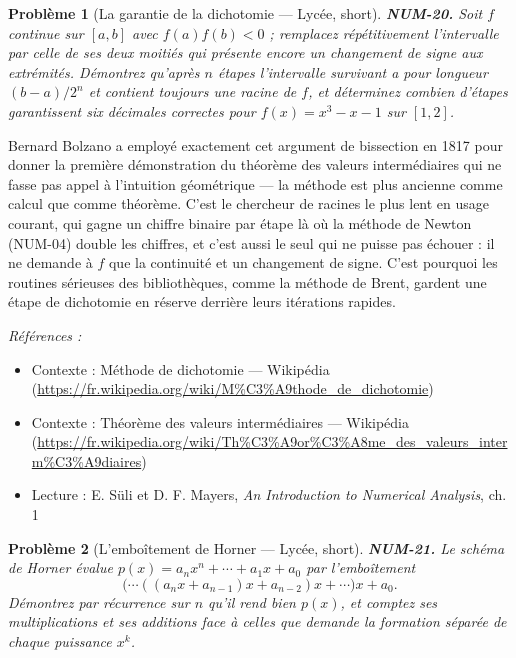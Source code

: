 \documentclass[11pt]{article}
\newtheorem{problem}{Problème}
\newenvironment{refs}{\par\small\noindent\emph{Références :}\begin{itemize}\setlength\itemsep{0pt}}{\end{itemize}\normalsize}
\begin{document}
\bigskip

\begin{problem}[{La garantie de la dichotomie --- Lycée, short}]
\textbf{NUM-20.} Soit $f$ continue sur $[a,b]$ avec $f(a)f(b) < 0$ ; remplacez répétitivement l'intervalle par celle de ses deux moitiés qui présente encore un changement de signe aux extrémités. Démontrez qu'après $n$ étapes l'intervalle survivant a pour longueur $(b-a)/2^n$ et contient toujours une racine de $f$, et déterminez combien d'étapes garantissent six décimales correctes pour $f(x) = x^3 - x - 1$ sur $[1,2]$.
\end{problem}

\noindent Bernard Bolzano a employé exactement cet argument de bissection en 1817 pour donner la première démonstration du théorème des valeurs intermédiaires qui ne fasse pas appel à l'intuition géométrique --- la méthode est plus ancienne comme calcul que comme théorème. C'est le chercheur de racines le plus lent en usage courant, qui gagne un chiffre binaire par étape là où la méthode de Newton (NUM-04) double les chiffres, et c'est aussi le seul qui ne puisse pas échouer : il ne demande à $f$ que la continuité et un changement de signe. C'est pourquoi les routines sérieuses des bibliothèques, comme la méthode de Brent, gardent une étape de dichotomie en réserve derrière leurs itérations rapides.

\begin{refs}
\item Contexte : Méthode de dichotomie --- Wikipédia (\url{https://fr.wikipedia.org/wiki/M%C3%A9thode_de_dichotomie})
\item Contexte : Théorème des valeurs intermédiaires --- Wikipédia (\url{https://fr.wikipedia.org/wiki/Th%C3%A9or%C3%A8me_des_valeurs_interm%C3%A9diaires})
\item Lecture : E. Süli et D. F. Mayers, \textit{An Introduction to Numerical Analysis}, ch. 1
\end{refs}

\bigskip

\begin{problem}[{L'emboîtement de Horner --- Lycée, short}]
\textbf{NUM-21.} Le schéma de Horner évalue $p(x) = a_n x^n + \cdots + a_1 x + a_0$ par l'emboîtement
\[ \big( \cdots ((a_n x + a_{n-1})x + a_{n-2})x + \cdots \big) x + a_0 . \]
Démontrez par récurrence sur $n$ qu'il rend bien $p(x)$, et comptez ses multiplications et ses additions face à celles que demande la formation séparée de chaque puissance $x^k$.
\end{problem}
\end{document}
